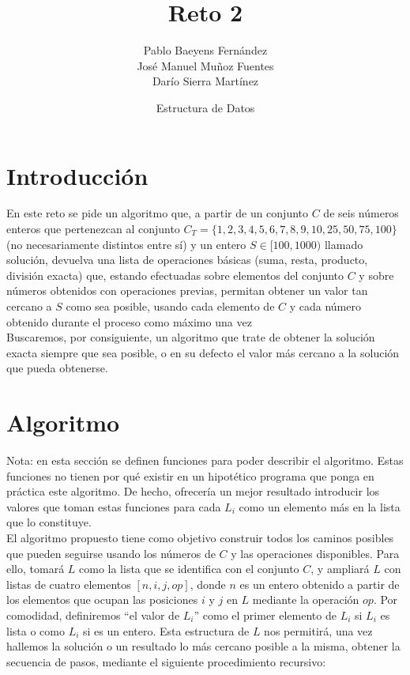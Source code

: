 \documentclass{article}
\title{Reto 2}
\date{Estructura de Datos}
\author{Pablo Baeyens Fernández\\José Manuel Muñoz Fuentes\\Darío Sierra Martínez}
\begin{document}
\maketitle

\section{Introducción}
En este reto se pide un algoritmo que, a partir de un conjunto $C$ de seis números enteros que
pertenezcan al conjunto $C_T = \{1, 2, 3, 4, 5, 6, 7, 8, 9, 10, 25, 50, 75, 100\}$ (no necesariamente distintos entre sí)
y un entero $S \in [100, 1000)$ llamado solución, devuelva una lista de
operaciones básicas (suma, resta, producto, división exacta) que, estando
efectuadas sobre elementos del conjunto $C$ y sobre números obtenidos con
operaciones previas, permitan obtener un valor tan cercano a $S$ como sea
posible, usando cada elemento de $C$ y cada número obtenido durante el proceso como máximo una vez \\

Buscaremos, por consiguiente, un algoritmo que trate de obtener la solución
exacta siempre que sea posible, o en su defecto el valor más cercano a la solución que
pueda obtenerse.

\section{Algoritmo}	
Nota: en esta sección se definen funciones para poder describir el algoritmo. Estas funciones no tienen por qué existir en un hipotético programa que ponga en práctica este algoritmo. De hecho, ofrecería un mejor resultado introducir los valores que toman estas funciones para cada $L_i$ como un elemento más en la lista que lo constituye. \\

El algoritmo propuesto tiene como objetivo construir todos los caminos posibles que pueden seguirse usando los números de $C$ y las operaciones disponibles. Para ello, tomará $L$ como la lista que se
identifica con el conjunto $C$, y ampliará $L$ con listas de cuatro elementos
$[n, i, j, op]$, donde $n$ es un entero obtenido a partir de los elementos que ocupan
las posiciones $i$ y $j$ en $L$ mediante la operación $op$. Por comodidad,
definiremos ``el valor de $L_i$'' como el primer elemento de $L_i$ si $L_i$ es lista o como $L_i$ si es
un entero. Esta estructura de $L$ nos permitirá, una vez hallemos la solución o
un resultado lo más cercano posible a la misma, obtener la secuencia de pasos,
mediante el siguiente procedimiento recursivo: \\
\end{document}
